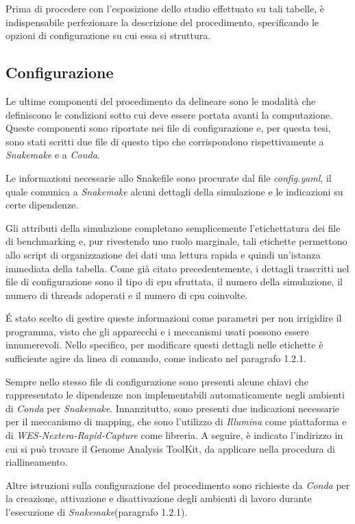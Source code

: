 Prima di procedere con l'esposizione dello studio effettuato su tali tabelle, è indispensabile perfezionare la descrizione del procedimento, specificando le opzioni di configurazione su cui essa si struttura.


\subsection{Configurazione}
Le ultime componenti del procedimento da delineare sono le modalità che definiscono le condizioni sotto cui deve essere portata avanti la computazione.
Queste componenti sono riportate nei file di configurazione e, per questa tesi, sono stati scritti due file di questo tipo che corrispondono rispettivamente a \textit{Snakemake} e a \textit{Conda}.

Le informazioni necessarie allo Snakefile sono procurate dal file \textit{config.yaml}, il quale comunica a \textit{Snakemake} alcuni dettagli della simulazione e le indicazioni su certe dipendenze.


Gli attributi della simulazione completano semplicemente l'etichettatura dei file di benchmarking e, pur rivestendo uno ruolo marginale, tali etichette permettono allo script di organizzazione dei dati una lettura rapida e quindi un'istanza immediata della tabella.
Come già citato precedentemente, i dettagli trascritti nel file di configurazione sono il tipo di cpu sfruttata, il numero della simulazione, il numero di threads adoperati e il numero di cpu coinvolte.

\'E stato scelto di gestire queste informazioni come parametri per non irrigidire il programma, visto che gli apparecchi e i meccanismi usati possono essere innumerevoli.
Nello specifico, per modificare questi dettagli nelle etichette è sufficiente agire da linea di comando, come indicato nel paragrafo 1.2.1.

Sempre nello stesso file di configurazione sono presenti alcune chiavi che rappresentato le dipendenze non implementabili automaticamente negli ambienti di \textit{Conda} per \textit{Snakemake}.
Innanzitutto, sono presenti due indicazioni necessarie per il meccanismo di mapping, che sono l'utilizzo di \textit{Illumina} come piattaforma e di \textit{WES-Nextera-Rapid-Capture} come libreria.
A seguire, è indicato l'indirizzo in cui si può trovare il Genome Analysis ToolKit, da applicare nella procedura di riallineamento.

Altre istruzioni sulla configurazione del procedimento sono richieste da \textit{Conda} per la creazione, attivazione e disattivazione degli ambienti di lavoro durante l'esecuzione di \textit{Snakemake}(paragrafo 1.2.1).

